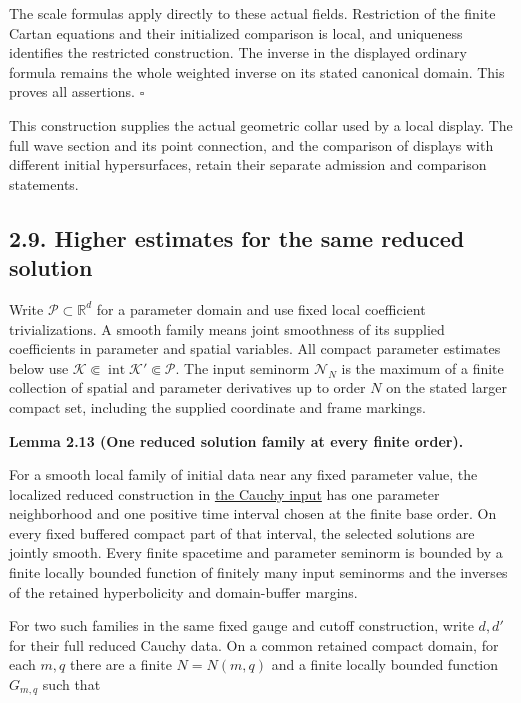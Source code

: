 \documentclass[
  english,
  11pt,
  reqno]{amsart}
\makeatletter
\newcommand{\pandocstatementheading}[1]{%
  \par\addpenalty{\@beginparpenalty}%
  \addvspace{.5\baselineskip plus .2\baselineskip minus .2\baselineskip}%
  {\normalfont\bfseries #1\par}%
  \nobreak\@afterindenttrue\@afterheading
}
\makeatother
\begin{document}
The scale formulas apply directly to these actual fields. Restriction of
the finite Cartan equations and their initialized comparison is local,
and uniqueness identifies the restricted construction. The inverse in
the displayed ordinary formula remains the whole weighted inverse on its
stated canonical domain. This proves all assertions. \hfill\(\square\)

This construction supplies the actual geometric collar used by a local
display. The full wave section and its point connection, and the
comparison of displays with different initial hypersurfaces, retain
their separate admission and comparison statements.
\subsection{2.9. Higher estimates for the same reduced
solution}\label{higher-estimates-for-the-same-reduced-solution}\label{sec:online-reduced-family-estimates}

Write \(\mathcal P\subset\mathbb R^d\) for a parameter domain and use
fixed local coefficient trivializations. A smooth family means joint
smoothness of its supplied coefficients in parameter and spatial
variables. All compact parameter estimates below use
\(\mathcal K\Subset\operatorname{int}\mathcal K'\Subset\mathcal P\). The
input seminorm \(\mathcal N_N\) is the maximum of a finite collection of
spatial and parameter derivatives up to order \(N\) on the stated larger
compact set, including the supplied coordinate and frame markings.

\pandocstatementheading{\leavevmode{}\label{lem:online-reduced-cauchy-finite-family-estimates}Lemma 2.13 (One reduced solution family at every finite order).}

For a smooth local family of initial data near any fixed parameter
value, the localized reduced construction in
\hyperref[thm:online-smooth-local-cauchy-input]{the Cauchy input} has
one parameter neighborhood and one positive time interval chosen at the
finite base order. On every fixed buffered compact part of that
interval, the selected solutions are jointly smooth. Every finite
spacetime and parameter seminorm is bounded by a finite locally bounded
function of finitely many input seminorms and the inverses of the
retained hyperbolicity and domain-buffer margins.

For two such families in the same fixed gauge and cutoff construction,
write \(d,d'\) for their full reduced Cauchy data. On a common retained
compact domain, for each \(m,q\) there are a finite \(N=N(m,q)\) and a
finite locally bounded function \(G_{m,q}\) such that
\end{document}
